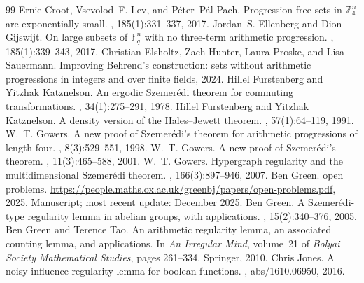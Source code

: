 \documentclass[10pt,a4paper]{amsart}
\begin{document}
\begin{thebibliography}{99}
 Ernie Croot, Vsevolod~F. Lev, and P{\'e}ter~P{\'a}l Pach. \newblock Progression-free sets in {$\mathbb{Z}_4^n$} are exponentially small. , 185(1):331--337, 2017.
 Jordan~S. Ellenberg and Dion Gijswijt. \newblock On large subsets of {$\mathbb{F}_q^n$} with no three-term arithmetic progression. , 185(1):339--343, 2017.
 Christian Elsholtz, Zach Hunter, Laura Proske, and Lisa Sauermann. \newblock Improving {Behrend}'s construction: sets without arithmetic progressions in integers and over finite fields, 2024.
 Hillel Furstenberg and Yitzhak Katznelson. \newblock An ergodic {Szemer{\'e}di} theorem for commuting transformations. , 34(1):275--291, 1978.
 Hillel Furstenberg and Yitzhak Katznelson. \newblock A density version of the {Hales--Jewett} theorem. , 57(1):64--119, 1991.
 W.~T. Gowers. \newblock A new proof of {Szemer{\'e}di}'s theorem for arithmetic progressions of length four. , 8(3):529--551, 1998.
 W.~T. Gowers. \newblock A new proof of {Szemer{\'e}di}'s theorem. , 11(3):465--588, 2001.
 W.~T. Gowers. \newblock Hypergraph regularity and the multidimensional {Szemer{\'e}di} theorem. , 166(3):897--946, 2007.
 Ben Green.  open problems. \newblock \url{https://people.maths.ox.ac.uk/greenbj/papers/open-problems.pdf}, 2025. \newblock Manuscript; most recent update: December 2025.
 Ben Green. \newblock A {Szemer{\'e}di}-type regularity lemma in abelian groups, with applications. , 15(2):340--376, 2005.
 Ben Green and Terence Tao. \newblock An arithmetic regularity lemma, an associated counting lemma, and applications. \newblock In {\em An Irregular Mind}, volume~21 of {\em Bolyai Society Mathematical Studies}, pages 261--334. Springer, 2010.
 Chris Jones. \newblock A noisy-influence regularity lemma for boolean functions. , abs/1610.06950, 2016.

\end{thebibliography}
\end{document}
